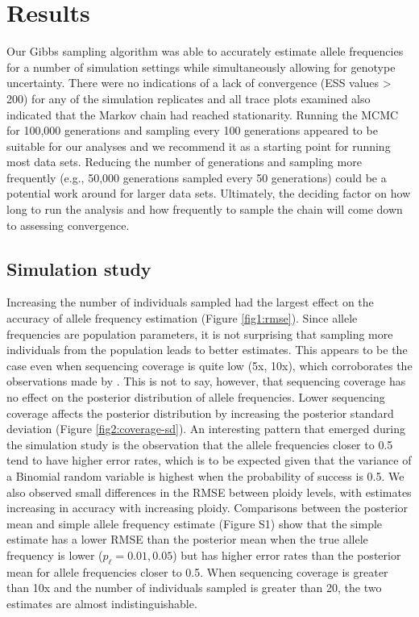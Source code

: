 \documentclass[11pt,english,letterpaper,oneside]{article}
\begin{document}
\section{Results}         %

Our Gibbs sampling algorithm was able to accurately estimate allele frequencies for a number of simulation settings while simultaneously allowing for genotype uncertainty. There were no indications of a lack of convergence (ESS values > 200) for any of the simulation replicates and all trace plots examined also indicated that the Markov chain had reached stationarity. Running the MCMC for 100,000 generations and sampling every 100 generations appeared to be suitable for our analyses and we recommend it as a starting point for running most data sets. Reducing the number of generations and sampling more frequently (e.g., 50,000 generations sampled every 50 generations) could be a potential work around for larger data sets. Ultimately, the deciding factor on how long to run the analysis and how frequently to sample the chain will come down to assessing convergence.

\medskip
\subsection{Simulation study}
\medskip

Increasing the number of individuals sampled had the largest effect on the accuracy of allele frequency estimation (Figure \ref{fig1:rmse}). Since allele frequencies are population parameters, it is not surprising that sampling more individuals from the population leads to better estimates. This appears to be the case even when sequencing coverage is quite low (5x, 10x), which corroborates the observations made by \cite{buerkle2013popModels}. This is not to say, however, that sequencing coverage has no effect on the posterior distribution of allele frequencies. Lower sequencing coverage affects the posterior distribution by increasing the posterior standard deviation (Figure \ref{fig2:coverage-sd}). An interesting pattern that emerged during the simulation study is the observation that the allele frequencies closer to 0.5 tend to have higher error rates, which is to be expected given that the variance of a Binomial random variable is highest when the probability of success is 0.5. We also observed small differences in the RMSE between ploidy levels, with estimates increasing in accuracy with increasing ploidy. Comparisons between the posterior mean and simple allele frequency estimate (Figure S1) show that the simple estimate has a lower RMSE than the posterior mean when the true allele frequency is lower ($p_\ell=0.01, 0.05$) but has higher error rates than the posterior mean for allele frequencies closer to 0.5. When sequencing coverage is greater than 10x and the number of individuals sampled is greater than 20, the two estimates are almost indistinguishable.
\end{document}
